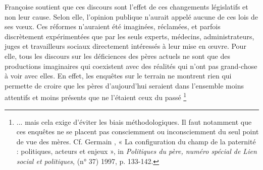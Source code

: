 Françoise  soutient que ces discours sont l'effet de ces changements législatifs et non leur cause.  Selon elle, l'opinion publique n'aurait appelé aucune de ces lois de ses vœux. Ces réformes n'auraient été imaginées, réclamées, et parfois discrètement expérimentées que par les seuls experts, médecins, administrateurs, juges et travailleurs sociaux directement intéressés à leur mise en œuvre. Pour elle, tous les discours sur les déficiences des pères actuels ne sont que des productions imaginaires qui coexistent avec des réalités qui n'ont pas grand-chose à voir avec elles. En effet, les enquêtes sur le terrain ne montrent rien qui permette de croire que les pères d'aujourd'hui seraient dans l'ensemble moins attentifs et moins présents que ne l'étaient ceux du passé
\footnote{... mais cela exige d'éviter les biais méthodologiques. Il faut notamment que ces enquêtes ne se placent pas consciemment ou inconsciemment du seul point de vue des mères. Cf. Germain , « La configuration du champ de la paternité : politiques, acteurs et enjeux », in \emph{Politiques du père, numéro spécial de Lien social et politiques}, (n° 37) 1997, p. 133-142.}%
